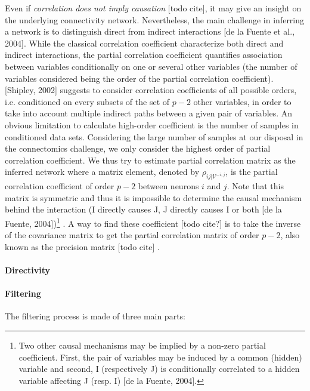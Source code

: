\documentclass[wcp]{jmlr}
\begin{document}
Even if \textit{correlation does not imply causation} [todo cite], it may give
an insight on the underlying connectivity network. Nevertheless, the main
challenge in inferring a network is to distinguish direct from indirect
interactions [de la Fuente et al., 2004]. While the classical correlation
coefficient characterize both direct and indirect interactions, the partial
correlation coefficient quantifies association between variables conditionally
on one or several other variables (the number of variables considered being the
order of the partial correlation coefficient). [Shipley, 2002] suggests to
consider correlation coefficients of all possible orders, i.e. conditioned on
every subsets of the set of $p-2$ other variables, in order to take into
account multiple indirect paths between a given pair of variables.  An obvious
limitation to calculate high-order coefficient is the number of samples in
conditioned data sets. Considering the large number of samples at our disposal
in the connectomics challenge, we only consider the highest order of partial
correlation coefficient. We thus try to estimate partial correlation matrix as
the inferred network where a matrix element, denoted by $\rho_{ij |
\mathcal{V}^{-i,j}}$, is the partial correlation coefficient of order $p-2$
between neurons $i$ and $j$. Note that this matrix is symmetric and thus it is
impossible to determine the causal mechanism behind the interaction (I directly
causes J, J directly causes I or both [de la Fuente, 2004])\footnote{Two other
causal mechanisms may be implied by a non-zero partial coefficient. First, the
pair of variables may be induced by a common (hidden) variable and second, I
(respectively J) is conditionally correlated to a hidden variable affecting J
(resp. I) [de la Fuente, 2004].} . A way to find these coefficient [todo cite?]
is to take the inverse of the covariance matrix to get the partial correlation
matrix of order $p-2$, also known as the precision matrix [todo cite] .

\paragraph{Directivity}

\paragraph{Filtering\\}

The filtering process is made of three main parts:
\end{document}

